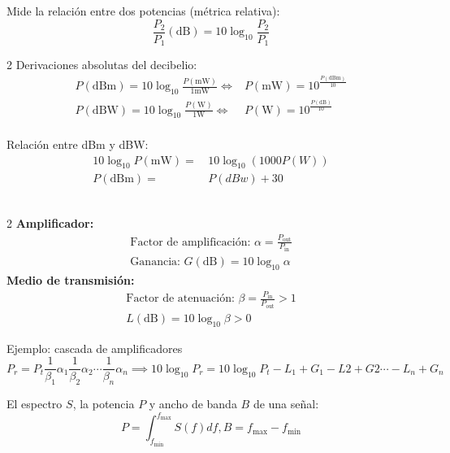 \documentclass[10pt,a4paper]{article}
\begin{document}
\begin{tcolorbox}[title=Decibelio]
    Mide la relación entre dos potencias (métrica relativa):
    \[
        \frac{P_2}{P_1}(\mathrm{dB}) = 10\log_{10}{\frac{P_2}{P_1}}
    \]
    \begin{multicols}{2}
        Derivaciones absolutas del decibelio:
        \[
            \begin{aligned}
                P(\mathrm{dBm}) = 10\log_{10}{\frac{P(\mathrm{mW})}{1\mathrm{mW}}} \Longleftrightarrow & P(\mathrm{mW}) = 10^{\frac{P(\mathrm{dBm})}{10}} \\
                P(\mathrm{dBW}) = 10\log_{10}{\frac{P(\mathrm{W})}{1\mathrm{W}}} \Longleftrightarrow & P(\mathrm{W}) = 10^{\frac{P(\mathrm{dB})}{10}}
            \end{aligned}
        \]
        \\
        Relación entre dBm y dBW:
        \[
            \begin{aligned}
                10\log_{10}{P(\mathrm{mW})} = & \hspace{2pt} 10\log_{10}{(1000P(W))} \\
                P(\mathrm{dBm}) = & \hspace{2pt} P(dBw) + 30
            \end{aligned}
        \]
        \\
    \end{multicols}
    \begin{multicols}{2}
        \textbf{Amplificador:}
        \[
            \begin{aligned}
                \text{Factor de amplificación: } \alpha = \frac{P_\mathrm{out}}{P_\mathrm{in}} \\
                \text{Ganancia: } G(\textrm{dB}) = 10\log_{10}{\alpha}
            \end{aligned}
        \]
        \textbf{Medio de transmisión:}
        \[
            \begin{aligned}
                \text{Factor de atenuación: } \beta = \frac{P_\mathrm{in}}{P_\mathrm{out}} > 1 \\
                L(\textrm{dB}) = 10\log_{10}{\beta} > 0
            \end{aligned}
        \]
    \end{multicols}

    Ejemplo: cascada de amplificadores
    \[
        P_r = P_t\frac{1}{\beta_1}\alpha_1\frac{1}{\beta_2}\alpha_2\cdots\frac{1}{\beta_n}\alpha_n \implies 10\log_{10}{P_r} = 10\log_{10}P_t - L_1 + G_1 - L2 + G2 \cdots - L_n + G_n
    \]
\end{tcolorbox}

\begin{tcolorbox}[title=Espectro de un a señal]
    El espectro $S$, la potencia $P$ y ancho de banda $B$ de una señal:
    \[
        P = \int_{f_{\textrm{min}}}^{f_{\textrm{max}}}{S(f)df}, B = f_\mathrm{max} - f_\mathrm{min}
    \]
\end{tcolorbox}
\end{document}
